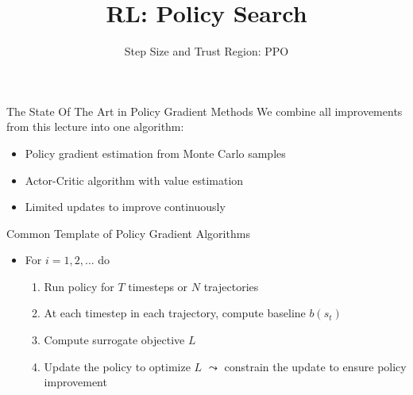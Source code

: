 \documentclass[aspectratio=169]{../latex_main/tntbeamer}  %
\title[RL: Policy Gradient]{RL: Policy Search}
\subtitle{Step Size and Trust Region: PPO}
\begin{document}
	
	\maketitle

\begin{frame}{The State Of The Art in Policy Gradient Methods}
We combine all improvements from this lecture into one algorithm:
    \begin{itemize}
        \item Policy gradient estimation from Monte Carlo samples
        \item Actor-Critic algorithm with value estimation
        \item Limited updates to improve continuously
    \end{itemize}
\end{frame}
\begin{frame}[c]{Common Template of Policy Gradient Algorithms}

	\begin{itemize}
	    \item For $i= 1,2,\ldots$ do
	    \begin{enumerate}
	        \item Run policy for $T$ timesteps or $N$ trajectories
	        \item At each timestep in each trajectory, compute baseline $b(s_t)$
	        \item Compute surrogate objective $L$
	        \item Update the policy to optimize $L$ $\leadsto$ constrain the update to ensure policy improvement
	    \end{enumerate}
	\end{itemize}

\end{frame}
\end{document}
